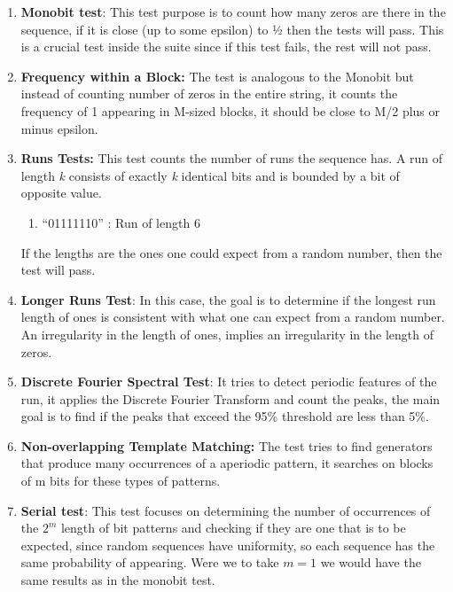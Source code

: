 \begin{enumerate}
\item  \textbf{Monobit test}: This test purpose is to count how many zeros are there in the sequence, if it is close (up to some epsilon) to ½ then the tests will pass. This is a crucial test inside the suite since if this test fails, the rest will not pass.

\item  \textbf{Frequency within a Block: }The test is analogous to the Monobit but instead of counting number of zeros in the entire string, it counts the frequency of 1 appearing in M-sized blocks, it should be close to M/2 plus or minus epsilon. 

\item  \textbf{Runs Tests: }This test counts the number of runs the sequence has. A run of length \textit{k} consists of exactly \textit{k} identical bits and is bounded by a bit of opposite value. 

\begin{enumerate}
\item  ``01111110'' : Run of length 6
\end{enumerate}


If the lengths are the ones one could expect from a random number, then the test will pass.


\item  \textbf{Longer Runs Test}: In this case, the goal is to determine if the longest run length of ones is consistent with what one can expect from a random number.  An irregularity in the length of ones, implies an irregularity in the length of zeros.

\item  \textbf{Discrete Fourier Spectral Test}: It tries to detect periodic features of the run, it applies the Discrete Fourier Transform and count the peaks, the main goal is to find if the peaks that exceed the 95\% threshold are less than 5\%.

\item  \textbf{Non-overlapping Template Matching:} The test tries to find generators that produce many occurrences of a aperiodic pattern, it searches on blocks of m bits for these types of patterns.

\item \textbf{ Serial test}: This test focuses on determining the number of occurrences of the $2^m$ length of bit patterns and checking if they are one that is to be expected, since random sequences have uniformity, so each sequence has the same probability of appearing. Were we to take $m=1$ we would have the same results as in the monobit test.


\end{enumerate}
